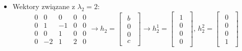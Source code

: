 \documentclass{article}
\begin{document}
\begin{itemize}
\begin{itemize}
$$\begin{array}{rrrr|c}
            0   &   0   &   0   &   0   &   0\\
            0   &  -2   &   1   &  -1   &   -2a
        \end{array}
        \rightarrow
        h_{1}^{2}
        =
        \begin{bmatrix}\begin{array}{c}
            0\\
            a\\
            b\\
            -b -2a
        \end{array}\end{bmatrix}
        \rightarrow
        h_{1}^{2}
        =
        \begin{bmatrix}\begin{array}{c}
            0\\
            0\\
            1\\
            -1
        \end{array}\end{bmatrix}
        $$
    \end{itemize}

    \item Wektory związane z $\lambda_{2} = 2$:
        $$
        \begin{array}{rrrr|r}
            0   &   0   &   0   &   0   &   0\\
            0   &   1   &  -1   &   0   &   0\\
            0   &   0   &   1   &   0   &   0\\
            0   &  -2   &   1   &   2   &   0
        \end{array}
        \rightarrow
        h_{2}
        =
        \begin{bmatrix}\begin{array}{c}
            b\\
            0\\
            0\\
            c
        \end{array}\end{bmatrix}
        \rightarrow
        h_{2}^{1}
        =
        \begin{bmatrix}\begin{array}{c}
            1\\
            0\\
            0\\
            0
        \end{array}\end{bmatrix}
        ,\,
        h_{2}^{2}
        =
        \begin{bmatrix}\begin{array}{c}
            0\\
            0\\
            0\\
            1
        \end{array}\end{bmatrix}
        $$
\end{itemize}
\end{document}
